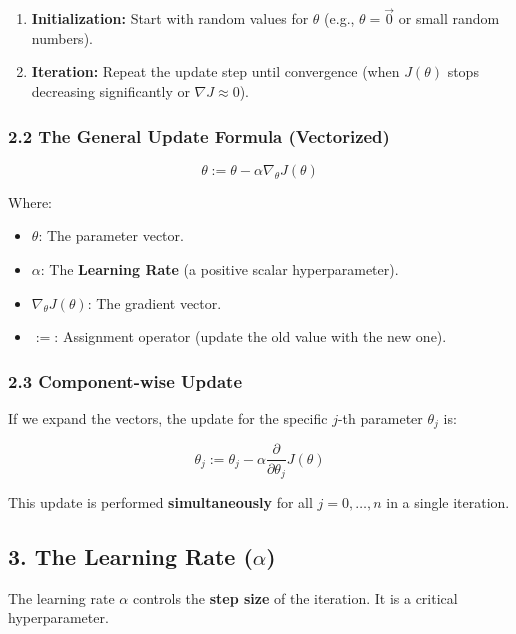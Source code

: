 \documentclass[
  italian,
  11pt,
]{article}
\begin{document}
\begin{enumerate}
\def\labelenumi{\arabic{enumi}.}
\item
  \textbf{Initialization:} Start with random values for \(\theta\)
  (e.g., \(\theta = \vec{0}\) or small random numbers).
\item
  \textbf{Iteration:} Repeat the update step until convergence (when
  \(J(\theta)\) stops decreasing significantly or
  \(\nabla J \approx 0\)).
\end{enumerate}

\subsubsection{2.2 The General Update Formula
(Vectorized)}\label{the-general-update-formula-vectorized}

\[\theta := \theta - \alpha \nabla_\theta J(\theta)\]

Where:

\begin{itemize}
\item
  \(\theta\): The parameter vector.
\item
  \(\alpha\): The \textbf{Learning Rate} (a positive scalar
  hyperparameter).
\item
  \(\nabla_\theta J(\theta)\): The gradient vector.
\item
  \(:=\): Assignment operator (update the old value with the new one).
\end{itemize}

\subsubsection{2.3 Component-wise Update}\label{component-wise-update}

If we expand the vectors, the update for the specific \(j\)-th parameter
\(\theta_j\) is:

\[\theta_j := \theta_j - \alpha \frac{\partial}{\partial \theta_j} J(\theta)\]

This update is performed \textbf{simultaneously} for all
\(j = 0, \dots, n\) in a single iteration.

\subsection{\texorpdfstring{3. The Learning Rate
(\(\alpha\))}{3. The Learning Rate (\textbackslash alpha)}}\label{the-learning-rate-alpha}

The learning rate \(\alpha\) controls the \textbf{step size} of the
iteration. It is a critical hyperparameter.
\end{document}
